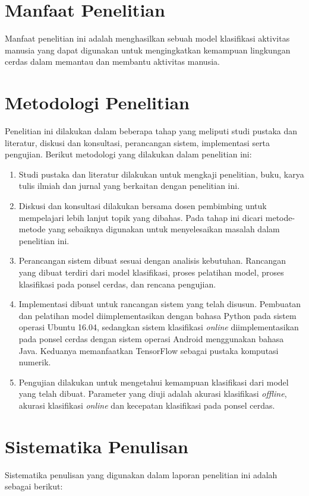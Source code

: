 \section{Manfaat Penelitian}
Manfaat penelitian ini adalah menghasilkan sebuah model klasifikasi aktivitas manusia yang dapat digunakan untuk mengingkatkan kemampuan lingkungan cerdas dalam memantau dan membantu aktivitas manusia.

\section{Metodologi Penelitian}
Penelitian ini dilakukan dalam beberapa tahap yang meliputi studi pustaka dan literatur, diskusi dan konsultasi, perancangan sistem, implementasi serta pengujian. Berikut metodologi yang dilakukan dalam penelitian ini:

\begin{enumerate}
    \item Studi pustaka dan literatur dilakukan untuk mengkaji penelitian, buku, karya tulis ilmiah dan jurnal yang berkaitan dengan penelitian ini.
    \item Diskusi dan konsultasi dilakukan bersama dosen pembimbing untuk mempelajari lebih lanjut topik yang dibahas. Pada tahap ini dicari metode-metode yang sebaiknya digunakan untuk menyelesaikan masalah dalam penelitian ini.
    \item Perancangan sistem dibuat sesuai dengan analisis kebutuhan. Rancangan yang dibuat terdiri dari model klasifikasi, proses pelatihan model, proses klasifikasi pada ponsel cerdas, dan rencana pengujian.
    \item Implementasi dibuat untuk rancangan sistem yang telah disusun. Pembuatan dan pelatihan model diimplementasikan dengan bahasa Python pada sistem operasi Ubuntu 16.04, sedangkan sistem klasifikasi \textit{online} diimplementasikan pada ponsel cerdas dengan sistem operasi Android menggunakan bahasa Java. Keduanya memanfaatkan TensorFlow sebagai pustaka komputasi numerik.
    \item Pengujian dilakukan untuk mengetahui kemampuan klasifikasi dari model yang telah dibuat. Parameter yang diuji adalah akurasi klasifikasi \textit{offline}, akurasi klasifikasi \textit{online} dan kecepatan klasifikasi pada ponsel cerdas.
\end{enumerate}

\section{Sistematika Penulisan}
Sistematika penulisan yang digunakan dalam laporan penelitian ini adalah sebagai berikut:

